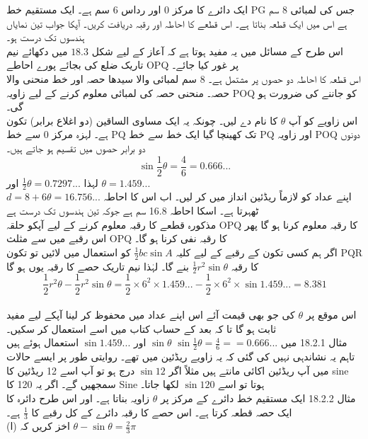 ایک دائرے کا مرکز 0 اور رداس 6 سم ہے۔ ایک مستقیم خط
PG
جس کی لمبائی 8 سم ہے اس میں ایک قطعہ بناتا ہے۔ اس قطعے کا احاطہ اور رقبہ دریافت کریں۔ آپکا جواب تین نمایاں ہندسوں تک درست ہو۔\\
اس طرح کے مسائل میں یہ مفید ہوتا ہے کہ آعاز کے لیے شکل
\(18.3\)
میں دکھائے نیم تاریک ضلع کی بجائے پورے احاطے
OPQ
پر غور کیا جائے۔\\
اس قطعہ کا احاطہ دو حصوں پر مشتمل ہے۔
8 سم لمبائی والا سیدھا حصہ اور خط منحنی والا حصہ۔ منحنی حصہ کی لمبائی معلوم کرنے کے لیے زاویہ
POQ
کو جاننے کی ضرورت ہو گی۔\\
اس زاویے کو آپ
\(\theta\)
کا نام دے لیں۔ چونکہ یہ ایک مساوی الساقین (دو اغلاع برابر) تکون ہے۔ لہزہ مرکز 0 سے خط 
PQ
تک کھینچا گیا ایک خط سے خط 
PQ
اور زاویہ 
POQ
دونوں دو برابر حصوں میں تقسیم ہو جاتے ہیں۔ 
\[\sin\frac{1}{2}\theta=\frac{4}{6}=0.666...\]
لہذا 
\(\frac{1}{2}\theta=0.7297...\)
اور 
\(\theta=1.459...\)
\\اپنے عداد کو لازماً ریڈئین انداز میں کر لیں۔ 
اب اس کا احاطہ 
\(d=8+6\theta=16.756...\)
ٹھہرتا ہے۔ 
اسکا احاطہ 16.8 سم ہے جوکہ تین ہندسوں تک درست ہے\\
مذکورہ قطعے کا رقبہ معلوم کرنے کے لیے آپکو حلقہ 
OPQ
کا رقبہ معلوم کرنا ہو گا 
پھر اس رقبے میں سے مثلث 
OPQ
کا رقبہ نفی کرنا ہو گا۔ \\
اگر ہم کسی تکون کے رقبے کے لیے کلیہ 
\(\frac{1}{2}bc\sin A\)
کو استعمال میں لائیں تو تکون 
PQR
کا رقبہ 
\(\frac{1}{2}r^2\sin\theta\)
بنے گا۔ لہٰذا نیم تاریک حصے کا رقبہ یوں ہو گا 
\[\frac{1}{2}r^2\theta-\frac{1}{2}r^2\sin\theta=\frac{1}{2}\times6^2\times1.459...-\frac{1}{2}\times6^2\times\sin1.459...=8.381\]\\
اس موقع پر 
\(\theta\)
کی جو بھی قیمت آئے اس اپنے عداد میں محفوظ کر لینا آپکے لیے مفید ثابت ہو گا تا کہ بعد کے حساب کتاب میں اسے استعمال کر سکیں۔ \\
مثال 18.2.1 میں 
\(\sin\frac{1}{2}\theta=\frac{4}{6}==0.666...\)
\(\sin\theta\)
اور 
\(\sin1.459...\)
استعمال ہوئے ہیں تاہم یہ نشاندہی نہیں کی گئی کہ یہ زاویے ریڈئین میں تھے۔ روایتی طور پر ایسے حالات میں آپ ریڈئین اکائی مانتے ہیں مثلاً اگر 
\(\sin12\)
درج ہو تو آپ اسے 12 ریڈئین کا 
sine
سمجھیں گے۔ اگر یہ 120 کا 
Sine
ہوتا تو اسے 
\(\sin120\)
لکھا جاتا۔ \\
مثال 18.2.2
ایک مستقیم خط دائرے کے مرکز پر 
\(\theta\)
زاویہ بناتا ہے۔ اور اس طرح دائرہ کا ایک حصہ قطعہ کرتا ہے۔ اس حصے کا رقبہ دائرے کے کل رقبے کا 
\(\frac{1}{3}\)
ہے۔ \\
(ا) اخز کریں کہ 
\(\theta-\sin\theta=\frac{2}{3}\pi\)\\
